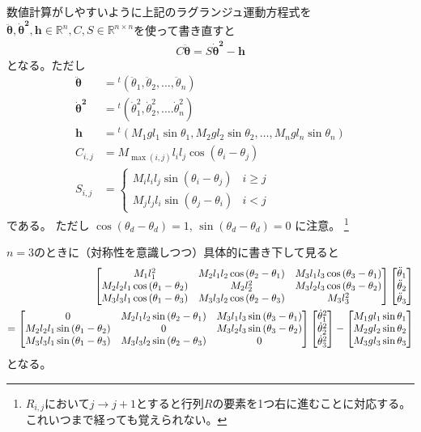 \documentclass{jsarticle}
\newcommand{\eqa}[1]{\begin{align}#1\end{align}}
\newcommand{\cost}[2]{\cos\left(\theta_{#1}-\theta_{#2}\right)}
\newcommand{\sint}[2]{\sin\left(\theta_{#1}-\theta_{#2}\right)}
\newcommand{\dott}[1]{\dot{\theta}_{#1}}
\newcommand{\ddott}[1]{\ddot{\theta}_{#1}}
\begin{document}
数値計算がしやすいように上記のラグランジュ運動方程式を$\bm{\ddot{\theta}}, \bm{\dot{\theta}^2}, \bm{h} \in \mathbb{R}^n, C, S \in \mathbb{R}^{n\times n}$を使って書き直すと
\eqa{
	C \bm{\ddot{\theta}} = S \bm{\dot{\theta}^2} - \bm{h}
}
となる。ただし
\eqa{
	\bm{\ddot{\theta}} &= {}^t(\ddott{1}, \ddott{2}, \dots, \ddott{n}) \\
	\bm{\dot{\theta}^2} &= {}^t(\dott{1}^2, \dott{2}^2, \dots. \dott{n}^2) \\
	\bm{h} &= {}^t(M_1 g l_1 \sin\theta_1, M_2 g l_2 \sin\theta_2, \dots, M_n g l_n \sin\theta_n) \\
	C_{i,j} &= M_{\max(i, j)} l_i l_j \cost{i}{j} \\
	S_{i,j} &= \begin{cases}
		M_i l_i l_j \sint{i}{j} & \text{$i \ge j$}\\
		M_j l_j l_i \sint{j}{i} & \text{$i < j$}
	\end{cases}
}
である。
ただし $\cost{d}{d} = 1$, $\sint{d}{d} = 0$ に注意。
\footnote{$R_{i,j}$において$j\rightarrow j+1$とすると行列$R$の要素を1つ右に進むことに対応する。これいつまで経っても覚えられない。}

$n=3$のときに（対称性を意識しつつ）具体的に書き下して見ると
\eqa{
	\begin{bmatrix}
		M_1 l_1^2 & M_2 l_1 l_2 \cost{2}{1} & M_3 l_1 l_3 \cost{3}{1} \\
		M_2 l_2 l_1 \cost{1}{2} & M_2 l_2^2 & M_3 l_2 l_3 \cost{3}{2} \\
		M_3 l_3 l_1 \cost{1}{3} & M_3 l_3 l_2 \cost{2}{3} & M_3 l_3^2
	\end{bmatrix}
	\begin{bmatrix}
		\ddott{1} \\ \ddott{2} \\ \ddott{3}
	\end{bmatrix} \notag\\
	=
	\begin{bmatrix}
		0 & M_2 l_1 l_2 \sint{2}{1} & M_3 l_1 l_3 \sint{3}{1} \\
		M_2 l_2 l_1 \sint{1}{2} & 0 & M_3 l_2 l_3 \sint{3}{2} \\
		M_3 l_3 l_1 \sint{1}{3} & M_3 l_3 l_2 \sint{2}{3} & 0
	\end{bmatrix}
	\begin{bmatrix}
		\dott{1}^2 \\ \dott{2}^2 \\ \dott{3}^2
	\end{bmatrix}
	-
	\begin{bmatrix}
		M_1 g l_1 \sin\theta_1 \\ M_2 g l_2 \sin\theta_2 \\ M_3 g l_3 \sin\theta_3
	\end{bmatrix}
}
となる。
\end{document}

